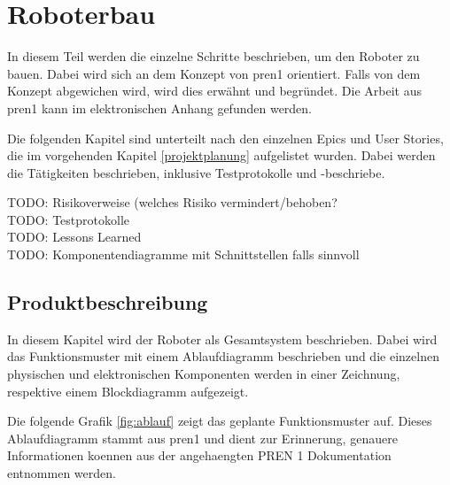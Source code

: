 \section{Roboterbau}

In diesem Teil werden die einzelne Schritte beschrieben, um den Roboter zu bauen. Dabei wird sich an dem Konzept von \acrshort{pren1} orientiert. Falls von dem Konzept abgewichen wird, wird dies erwähnt und begründet. Die Arbeit aus \acrshort{pren1} kann im elektronischen Anhang gefunden werden.

Die folgenden Kapitel sind unterteilt nach den einzelnen Epics und User Stories, die im vorgehenden Kapitel \ref{projektplanung} aufgelistet wurden. Dabei werden die Tätigkeiten beschrieben, inklusive Testprotokolle und -beschriebe.

TODO: Risikoverweise (welches Risiko vermindert/behoben? \\
TODO: Testprotokolle \\
TODO: Lessons Learned \\
TODO: Komponentendiagramme mit Schnittstellen falls sinnvoll \\

\subsection{Produktbeschreibung}

In diesem Kapitel wird der Roboter als Gesamtsystem beschrieben. Dabei wird das Funktionsmuster mit einem Ablaufdiagramm beschrieben und die einzelnen physischen und elektronischen Komponenten werden in einer Zeichnung, respektive einem Blockdiagramm aufgezeigt.


Die folgende Grafik \ref{fig:ablauf} zeigt das geplante Funktionsmuster auf. Dieses Ablaufdiagramm stammt aus \acrshort{pren1} und dient zur Erinnerung, genauere Informationen koennen aus der angehaengten PREN 1 Dokumentation entnommen werden.

